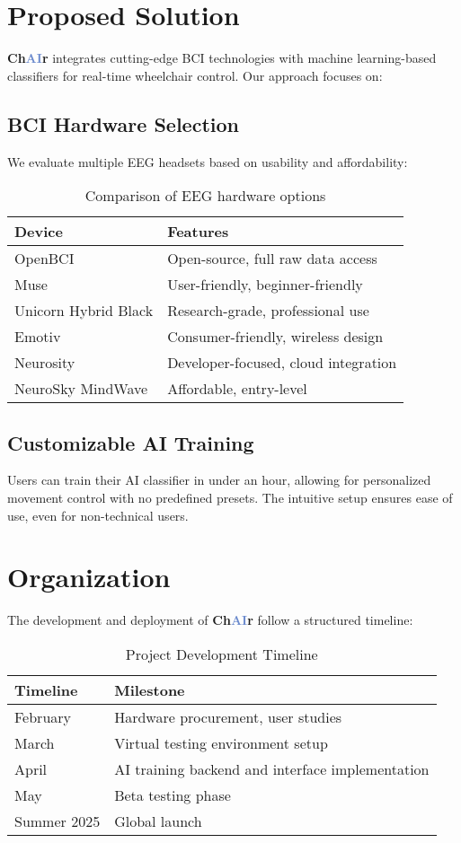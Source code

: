 \documentclass[a4paper]{article}
\newcommand\chair{\textbf{Ch\textcolor[HTML]{6B8ACD}{AI}r}\xspace}
\begin{document}
\section{Proposed Solution}

\chair integrates cutting-edge BCI technologies with machine learning-based
classifiers for real-time wheelchair control. Our approach focuses on:

\subsection{BCI Hardware Selection}
We evaluate multiple EEG headsets based on usability and affordability:
\begin{table}[ht]
    \centering
    \begin{tabular}{ll}
    \toprule
    Device & Features \\
    \midrule
    OpenBCI & Open-source, full raw data access \\
    Muse & User-friendly, beginner-friendly \\
    Unicorn Hybrid Black & Research-grade, professional use \\
    Emotiv & Consumer-friendly, wireless design \\
    Neurosity & Developer-focused, cloud integration \\
    NeuroSky MindWave & Affordable, entry-level \\
    \bottomrule
    \end{tabular}
    \caption{Comparison of EEG hardware options}
\end{table}

\subsection{Customizable AI Training}
Users can train their AI classifier in under an hour, allowing for
personalized movement control with no predefined presets. The intuitive
setup ensures ease of use, even for non-technical users.

\section{Organization}

The development and deployment of \chair follow a structured timeline:
\begin{table}[ht]
    \centering
    \begin{tabular}{ll}
    \toprule
    Timeline & Milestone \\
    \midrule
    February & Hardware procurement, user studies \\
    March & Virtual testing environment setup \\
    April & AI training backend and interface implementation \\
    May & Beta testing phase \\
    Summer 2025 & Global launch \\
    \bottomrule
    \end{tabular}
    \caption{Project Development Timeline}
\end{table}
\end{document}
